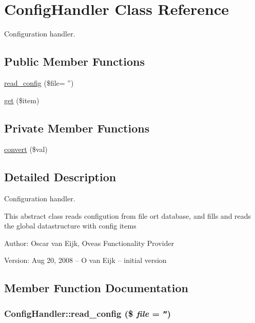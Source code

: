 \hypertarget{classConfigHandler}{
\section{ConfigHandler Class Reference}
\label{classConfigHandler}
}
Configuration handler.  


\subsection*{Public Member Functions}
\begin{CompactItemize}
\item 
\hyperlink{classConfigHandler_75a7f03f156cd0f315f91ec4bbddfbb6}{read\_\-config} (\$file= '')
\item 
\hyperlink{classConfigHandler_e55c0b4508da28ff46299bb7111435cf}{get} (\$item)
\end{CompactItemize}
\subsection*{Private Member Functions}
\begin{CompactItemize}
\item 
\hyperlink{classConfigHandler_df3dd923bfd38e0274dc86ebd0caed92}{convert} (\$val)
\end{CompactItemize}


\subsection{Detailed Description}
Configuration handler. 

This abstract class reads configution from file ort database, and fills and reads the global datastructure with config items \begin{Desc}
\item[Author:]Oscar van Eijk, Oveas Functionality Provider \end{Desc}
\begin{Desc}
\item[Version:]Aug 20, 2008 -- O van Eijk -- initial version \end{Desc}


\subsection{Member Function Documentation}
\hypertarget{classConfigHandler_75a7f03f156cd0f315f91ec4bbddfbb6}{
\subsubsection{\setlength{\rightskip}{0pt plus 5cm}ConfigHandler::read\_\-config (\$ {\em file} = {\tt ''})}}
\label{classConfigHandler_75a7f03f156cd0f315f91ec4bbddfbb6}


